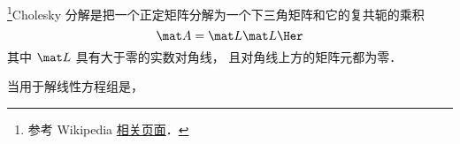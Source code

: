 

\footnote{参考 Wikipedia \href{https://en.wikipedia.org/wiki/Cholesky_decomposition}{相关页面}．}Cholesky 分解是把一个正定矩阵分解为一个下三角矩阵和它的复共轭的乘积
\begin{equation}
\mat A = \mat L \mat L\Her
\end{equation}
其中 $\mat L$ 具有大于零的实数对角线， 且对角线上方的矩阵元都为零．

当用于解线性方程组是， 
